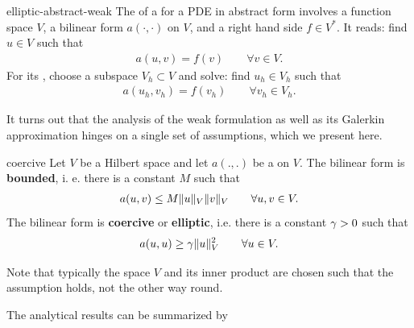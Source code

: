 \begin{Definition}{elliptic-abstract-weak}
  The  of a 
  for a PDE in abstract form involves a function space $V$, a bilinear
  form $a(\cdot,\cdot)$ on $V$, and a right hand side $f\in V^*$. It
  reads: find $u\in V$ such that
  \begin{gather}
    \label{eq:elliptic-abstract-weak}
    a(u,v) = f(v) \qquad\forall v\in V.
  \end{gather}
  For its , choose a subspace
  $V_h\subset V$ and solve: find $u_h\in V_h$ such that
  \begin{gather}
    \label{eq:elliptic-abstract-galerkin}
    a(u_h,v_h) = f(v_h) \qquad\forall v_h\in V_h.
  \end{gather}
\end{Definition}

It turns out that the analysis of the weak formulation as well as its
Galerkin approximation hinges on a single set of assumptions, which we
present here.

\begin{Assumption}{coercive}
  Let $V$ be a Hilbert space and let $a(.,.)$ be a  on $V$.  The bilinear form is
  \textbf{bounded}, i. e. there is a
  constant $M$ such that
  \begin{gather}
    a(u,v) \le M \lVert u\rVert_V \lVert v\rVert_V \qquad \forall u,v\in V.
  \end{gather}
  The bilinear form is \textbf{coercive}
  or \textbf{elliptic}, i.e. there is a
  constant $\gamma > 0$ such that
  \begin{gather}
    \label{eq:infsup:elliptic}
    a(u,u) \ge \gamma \lVert u\rVert_V^2 \qquad \forall u\in V.
  \end{gather}
\end{Assumption}

Note that typically the space $V$ and its inner product are chosen
such that the assumption holds, not the other way round.

The analytical results can be summarized by

